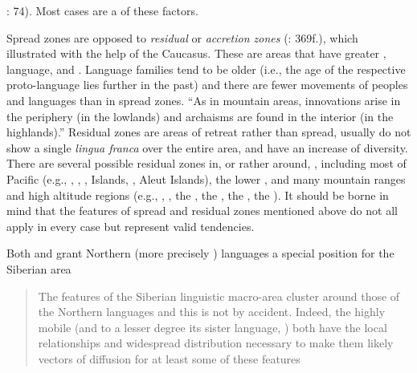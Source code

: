 \citealt{Janhunen2007a}: 74). Most cases are a  of these factors.

Spread zones are opposed to \textit{residual} or \textit{accretion zones} (\citealt{Nichols1997}: 369f.), which \cite[13–15]{Nichols1992} illustrated with the help of the Caucasus. These are areas that have greater , language, and . Language families tend to be older (i.e., the age of the respective proto-language lies further in the past) and there are fewer movements of peoples and languages than in spread zones. “As in mountain areas, innovations arise in the periphery (in the lowlands) and archaisms are found in the interior (in the highlands).” \citep[14]{Nichols1992} Residual zones are areas of retreat rather than spread, usually do not show a single \textit{lingua franca} over the entire area, and have an increase of diversity. There are several possible residual zones in, or rather around, , including most of Pacific  (e.g., , , ,  Islands, , Aleut Islands), the lower , and many mountain ranges and high altitude regions (e.g., , , the , the , the , the ). It should be borne in mind that the features of spread and residual zones mentioned above do not all apply in every case but represent valid tendencies.


Both \citet{Anderson2006a} and \citet{Pakendorf2010} grant Northern  (more precisely ) languages a special position for the Siberian area

\begin{quote}
The features of the Siberian linguistic macro-area cluster around those of the Northern  languages and this is not by accident. Indeed, the highly mobile  (and to a lesser degree its sister language, ) both have the local  relationships and widespread distribution necessary to make them likely vectors of diffusion for at least some of these features \citep[294]{Anderson2006a}
\end{quote}

